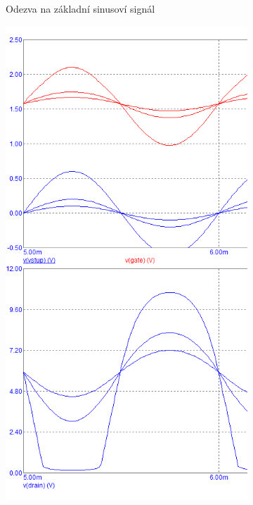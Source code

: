 \documentclass{article}
\begin{document}
\begin{figure}[H]
\begin{minipage}[t]{0.30\textwidth}
\begin{figure}[H]
      \caption{\label{UNI_Tranzient_reduk_1} Odezva na základní sinusoví signál}
    \end{figure}
  \end{minipage}
  \hfill
  \begin{minipage}[t]{0.33\textwidth}
    \begin{figure}[H]
      \includegraphics[width=\textwidth]{PC/UNI/UNI_Tranzient_2_1.png}

\end{figure}
\end{minipage}
\end{figure}
\end{document}
